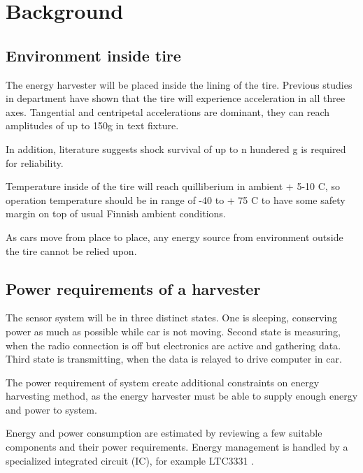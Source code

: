 \section{Background}

\subsection{Environment inside tire}
The energy harvester will be placed inside the lining of the tire. Previous studies in department have shown
that the tire will experience acceleration in all three axes. Tangential and centripetal accelerations are dominant,
they can reach amplitudes of up to 150g in text fixture. 

In addition, literature suggests shock survival of up to n hundered g is required for reliability. 

Temperature inside of the tire will reach quilliberium in ambient + 5-10 \degree C, so operation temperature should be
in range of -40 to + 75 \degree C to have some safety margin on top of usual Finnish ambient conditions.

As cars move from place to place, any energy source from environment outside the tire cannot be relied upon. 

\subsection{Power requirements of a harvester}
The sensor system will be in three distinct states. One is sleeping, conserving power as much as possible while car is not moving.
Second state is measuring, when the radio connection is off but electronics are active and gathering data.
Third state is transmitting, when the data is relayed to drive computer in car.

The power requirement of system create additional constraints on energy harvesting method, as the energy harvester must be able to supply 
enough energy and power to system. 

Energy and power consumption are estimated by reviewing a few suitable components and their power requirements. 
Energy management is handled by a specialized integrated circuit (IC), for example LTC3331 \cite[p. 2] {Technology}.




